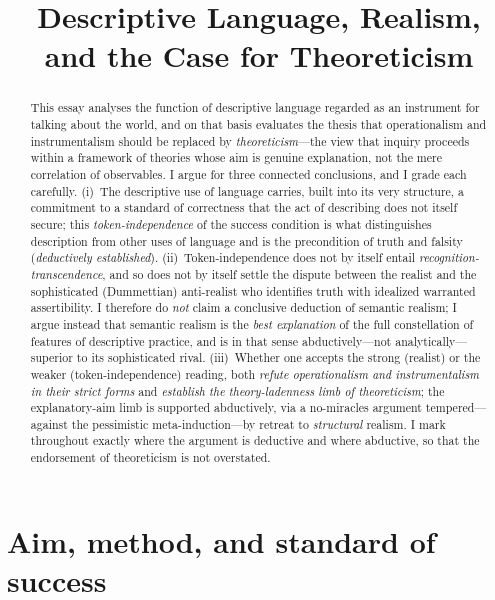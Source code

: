 \documentclass[12pt]{article}
\title{Descriptive Language, Realism, and the Case for Theoreticism}
\author{}
\date{}
\begin{document}
\maketitle

\begin{abstract}
This essay analyses the function of descriptive language regarded as an
instrument for talking about the world, and on that basis evaluates the
thesis that operationalism and instrumentalism should be replaced by
\emph{theoreticism}---the view that inquiry proceeds within a framework of
theories whose aim is genuine explanation, not the mere correlation of
observables. I argue for three connected conclusions, and I grade each
carefully. (i)~The descriptive use of language carries, built into its
very structure, a commitment to a standard of correctness that the act of
describing does not itself secure; this \emph{token-independence} of the
success condition is what distinguishes description from other uses of
language and is the precondition of truth and falsity (\emph{deductively
established}). (ii)~Token-independence does not by itself entail
\emph{recognition-transcendence}, and so does not by itself settle the
dispute between the realist and the sophisticated (Dummettian)
anti-realist who identifies truth with idealized warranted
assertibility. I therefore do \emph{not} claim a conclusive deduction of
semantic realism; I argue instead that semantic realism is the
\emph{best explanation} of the full constellation of features of
descriptive practice, and is in that sense abductively---not
analytically---superior to its sophisticated rival. (iii)~Whether one
accepts the strong (realist) or the weaker (token-independence) reading,
both \emph{refute operationalism and instrumentalism in their strict
forms} and \emph{establish the theory-ladenness limb of theoreticism};
the explanatory-aim limb is supported abductively, via a no-miracles
argument tempered---against the pessimistic meta-induction---by retreat to
\emph{structural} realism. I mark throughout exactly where the argument is
deductive and where abductive, so that the endorsement of theoreticism is
not overstated.
\end{abstract}

\section{Aim, method, and standard of success}
\end{document}
